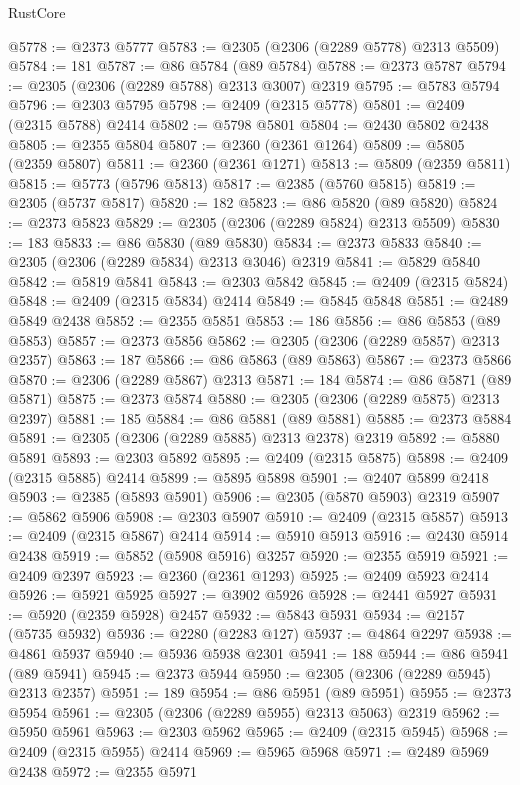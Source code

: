 \begin{lexlean}{RustCore}
\begin{coremodule}
@5778 := @2373 @5777
@5783 := @2305 (@2306 (@2289 @5778) @2313 @5509)
@5784 := 181
@5787 := @86 @5784 (@89 @5784)
@5788 := @2373 @5787
@5794 := @2305 (@2306 (@2289 @5788) @2313 @3007) @2319
@5795 := @5783 @5794
@5796 := @2303 @5795
@5798 := @2409 (@2315 @5778)
@5801 := @2409 (@2315 @5788) @2414
@5802 := @5798 @5801
@5804 := @2430 @5802 @2438
@5805 := @2355 @5804
@5807 := @2360 (@2361 @1264)
@5809 := @5805 (@2359 @5807)
@5811 := @2360 (@2361 @1271)
@5813 := @5809 (@2359 @5811)
@5815 := @5773 (@5796 @5813)
@5817 := @2385 (@5760 @5815)
@5819 := @2305 (@5737 @5817)
@5820 := 182
@5823 := @86 @5820 (@89 @5820)
@5824 := @2373 @5823
@5829 := @2305 (@2306 (@2289 @5824) @2313 @5509)
@5830 := 183
@5833 := @86 @5830 (@89 @5830)
@5834 := @2373 @5833
@5840 := @2305 (@2306 (@2289 @5834) @2313 @3046) @2319
@5841 := @5829 @5840
@5842 := @5819 @5841
@5843 := @2303 @5842
@5845 := @2409 (@2315 @5824)
@5848 := @2409 (@2315 @5834) @2414
@5849 := @5845 @5848
@5851 := @2489 @5849 @2438
@5852 := @2355 @5851
@5853 := 186
@5856 := @86 @5853 (@89 @5853)
@5857 := @2373 @5856
@5862 := @2305 (@2306 (@2289 @5857) @2313 @2357)
@5863 := 187
@5866 := @86 @5863 (@89 @5863)
@5867 := @2373 @5866
@5870 := @2306 (@2289 @5867) @2313
@5871 := 184
@5874 := @86 @5871 (@89 @5871)
@5875 := @2373 @5874
@5880 := @2305 (@2306 (@2289 @5875) @2313 @2397)
@5881 := 185
@5884 := @86 @5881 (@89 @5881)
@5885 := @2373 @5884
@5891 := @2305 (@2306 (@2289 @5885) @2313 @2378) @2319
@5892 := @5880 @5891
@5893 := @2303 @5892
@5895 := @2409 (@2315 @5875)
@5898 := @2409 (@2315 @5885) @2414
@5899 := @5895 @5898
@5901 := @2407 @5899 @2418
@5903 := @2385 (@5893 @5901)
@5906 := @2305 (@5870 @5903) @2319
@5907 := @5862 @5906
@5908 := @2303 @5907
@5910 := @2409 (@2315 @5857)
@5913 := @2409 (@2315 @5867) @2414
@5914 := @5910 @5913
@5916 := @2430 @5914 @2438
@5919 := @5852 (@5908 @5916) @3257
@5920 := @2355 @5919
@5921 := @2409 @2397
@5923 := @2360 (@2361 @1293)
@5925 := @2409 @5923 @2414
@5926 := @5921 @5925
@5927 := @3902 @5926
@5928 := @2441 @5927
@5931 := @5920 (@2359 @5928) @2457
@5932 := @5843 @5931
@5934 := @2157 (@5735 @5932)
@5936 := @2280 (@2283 @127)
@5937 := @4864 @2297
@5938 := @4861 @5937
@5940 := @5936 @5938 @2301
@5941 := 188
@5944 := @86 @5941 (@89 @5941)
@5945 := @2373 @5944
@5950 := @2305 (@2306 (@2289 @5945) @2313 @2357)
@5951 := 189
@5954 := @86 @5951 (@89 @5951)
@5955 := @2373 @5954
@5961 := @2305 (@2306 (@2289 @5955) @2313 @5063) @2319
@5962 := @5950 @5961
@5963 := @2303 @5962
@5965 := @2409 (@2315 @5945)
@5968 := @2409 (@2315 @5955) @2414
@5969 := @5965 @5968
@5971 := @2489 @5969 @2438
@5972 := @2355 @5971

\end{coremodule}
\end{lexlean}
